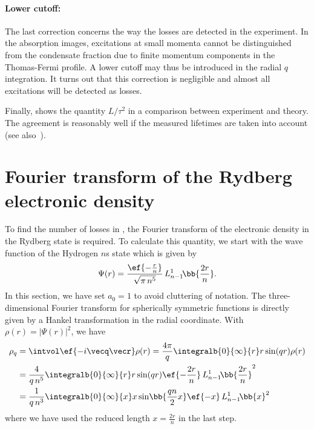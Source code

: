 \paragraph{Lower cutoff:}
The last correction concerns the way the losses are detected in the experiment. In the absorption images, excitations at small momenta cannot be distinguished from the condensate fraction due to finite momentum components in the Thomas-Fermi profile. A lower cutoff may thus be introduced in the radial $q$ integration. It turns out that this correction is negligible and almost all excitations will be detected as losses.

\bigskip
Finally,  shows the quantity $L/\tau^2$ in a comparison between experiment and theory. The agreement is reasonably well if the measured lifetimes are taken into account (see also~).


\section{Fourier transform of the Rydberg electronic density}
To find the number of losses in , the Fourier transform of the electronic density in the Rydberg state is required. To calculate this quantity, we start with the wave function of the Hydrogen $n$s state which is given by
\begin{align}
\Psi(r)=\frac{\ef{-\frac{r}{n}}}{\sqrt{\pi\, n^5}} \, L_{n-1}^1\!\bb{\frac{2 r}{n}}.
\end{align}
In this section, we have set $a_0=1$ to avoid cluttering of notation.
The three-dimensional Fourier transform for spherically symmetric functions is directly given by a Hankel transformation in the radial coordinate. With $\rho(r)=|\Psi(r)|^2$, we have
\begin{align}
    \rho_q&=\intvol \ef{-i \vecq \vecr} \rho(r) =\frac{4\pi}{q}\integralb{0}{\infty}{r} r \sin(qr) \rho(r) \\
    &=\frac{4}{q\,n^5}\integralb{0}{\infty}{r} r \sin(qr) \ef{-\frac{2r}{n}} \, L_{n-1}^1\!\bb{\frac{2 r}{n}}^2 \\
    &=\frac{1}{q\,n^3}\integralb{0}{\infty}{x} x \sin\!\bb{\frac{qn}{2}x} \ef{-x} \, L_{n-1}^1\!\bb{x}^2
\end{align}
where we have used the reduced length $x=\frac{2r}{n}$ in the last step.
